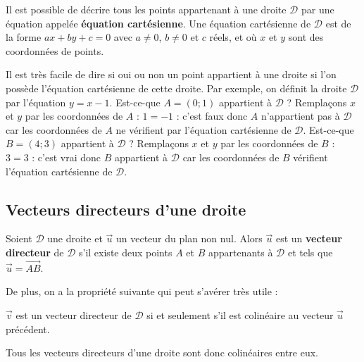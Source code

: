 	\begin{formula}[Définition]
		Il est possible de décrire tous les points appartenant à une droite $\mathcal{D}$ par une équation appelée \textbf{équation cartésienne}.
		\newpar
		Une équation cartésienne de $\mathcal{D}$ est de la forme $ax + by + c = 0$ avec $a \neq 0$, $b \neq 0$ et $c$ réels, et où $x$ et $y$ sont des coordonnées de points.
	\end{formula}

	\begin{tip}
		Il est très facile de dire si oui ou non un point appartient à une droite si l'on possède l'équation cartésienne de cette droite.
		\newpar
		Par exemple, on définit la droite $\mathcal{D}$ par l'équation $y = x - 1$.
		\newpar
		Est-ce-que $A = (0; 1)$ appartient à $\mathcal{D}$ ? Remplaçons $x$ et $y$ par les coordonnées de $A$ : $1 = -1$ : c'est faux donc $A$ n'appartient pas à $\mathcal{D}$ car les coordonnées de $A$ ne vérifient par l'équation cartésienne de $\mathcal{D}$.
		\newpar
		Est-ce-que $B = (4; 3)$ appartient à $\mathcal{D}$ ? Remplaçons $x$ et $y$ par les coordonnées de $B$ : $3 = 3$ : c'est vrai donc $B$ appartient à $\mathcal{D}$ car les coordonnées de $B$ vérifient l'équation cartésienne de $\mathcal{D}$.
	\end{tip}

	\subsection{Vecteurs directeurs d'une droite}

	\begin{formula}[Définition]
		Soient $\mathcal{D}$ une droite et $\overrightarrow{u}$ un vecteur du plan non nul. Alors $\overrightarrow{u}$ est un \textbf{vecteur directeur} de $\mathcal{D}$ s'il existe deux points $A$ et $B$ appartenants à $\mathcal{D}$ et tels que $\overrightarrow{u} = \overrightarrow{AB}$.
	\end{formula}

	De plus, on a la propriété suivante qui peut s'avérer très utile :

	\begin{formula}
		$\overrightarrow{v}$ est un vecteur directeur de $\mathcal{D}$ si et seulement s'il est colinéaire au vecteur $\overrightarrow{u}$ précédent.
	\end{formula}

	Tous les vecteurs directeurs d'une droite sont donc colinéaires entre eux.

